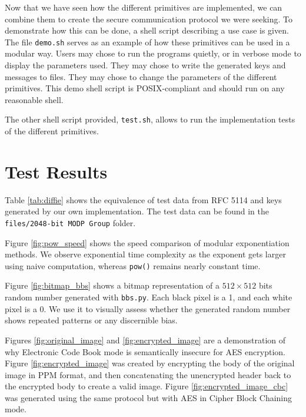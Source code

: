 \documentclass{article}
\begin{document}
Now that we have seen how the different primitives are implemented, we can combine them to create the secure communication protocol we were seeking. To demonstrate how this can be done, a shell script describing a use case is given. The file \verb+demo.sh+ serves as an example of how these primitives can be used in a modular way. Users may chose to run the programs quietly, or in verbose mode to display the parameters used. They may chose to write the generated keys and messages to files. They may chose to change the parameters of the different primitives. This demo shell script is POSIX-compliant and should run on any reasonable shell. 
  
The other shell script provided, \verb+test.sh+, allows to run the implementation tests of the different primitives. 

\section{Test Results}

Table \ref{tab:diffie} shows the equivalence of test data from RFC 5114 \cite{rfc5114} and keys generated by our own implementation. The test data can be found in the \verb+files/2048-bit MODP Group+ folder.


Figure \ref{fig:pow_speed} shows the speed comparison of modular exponentiation methods. We observe exponential time complexity as the exponent gets larger using naive computation, whereas \verb+pow()+ remains nearly constant time.

Figure \ref{fig:bitmap_bbs} shows a bitmap representation of a $512 \times 512$ bits random number generated with \verb+bbs.py+. Each black pixel is a 1, and each white pixel is a 0. We use it to visually assess whether the generated random number shows repeated patterns or any discernible bias. 

Figures \ref{fig:original_image} and \ref{fig:encrypted_image} are a demonstration of why Electronic Code Book mode is semantically insecure for AES encryption. Figure \ref{fig:encrypted_image} was created by encrypting the body of the original image in PPM format, and then concatenating the unencrypted header back to the encrypted body to create a valid image. Figure \ref{fig:encrypted_image_cbc} was generated using the same protocol but with AES in Cipher Block Chaining mode.
\end{document}
